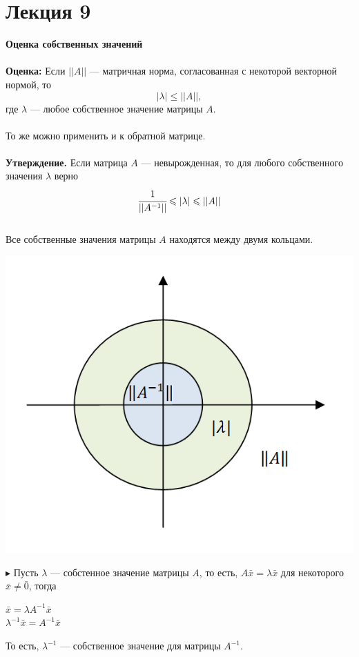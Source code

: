 \documentclass[12pt]{article}
\theoremstyle{definition}
\numberwithin{equation}{section}
\begin{document}
	\section *{Лекция 9}
	\noindent\textbf{Оценка собственных значений}\\ \\
	\textbf{Оценка:} Если $||A||$ --- матричная норма, согласованная с некоторой векторной нормой, то $$|\lambda|\leqslant||A||,$$ где $\lambda$ --- любое собственное значение матрицы $A$.\\
	\\
	То же можно применить и к обратной матрице.\\
	\\
	\textbf{Утверждение.} Если матрица $A$ --- невырожденная, то для любого собственного значения $\lambda$ верно $$\cfrac{1}{||A^{-1}||}\leqslant|\lambda|\leqslant||A||$$
	~\\Все собственные значения матрицы $A$ находятся между двумя кольцами.
	\begin{center}
		\includegraphics[scale=0.8]{l9_1.png}
	\end{center}
	$\blacktriangleright$ Пусть $\lambda$ --- собстенное значение матрицы $A$, то есть, $A\bar x=\lambda\bar x$ для некоторого $\bar x\neq \bar 0$, тогда
	\begin{center}
		$\bar x=\lambda A^{-1} \bar x$\\
		$\lambda^{-1}\bar x=A^{-1}\bar x$
	\end{center}
	То есть, $\lambda^{-1}$ --- собственное значение для матрицы $A^{-1}$.\\
\end{document}
